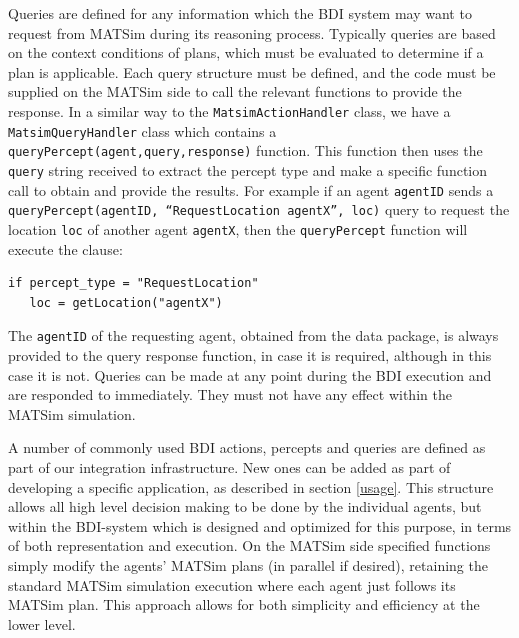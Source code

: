 Queries are defined for any information which the BDI system may want
to request from MATSim during its reasoning process. Typically queries
are based on the context conditions of plans, which must be evaluated
to determine if a plan is applicable. Each query structure must be
defined, and the code must be supplied on the MATSim side to call the
relevant functions to provide the response. 
In a similar way to the \texttt{MatsimActionHandler} class, we have a
\texttt{MatsimQueryHandler} 
class which contains a \texttt{queryPercept(agent,query,response)}
function.
This function then uses the \texttt{query} string received to extract the
percept type and make a specific function call to obtain and provide the
results. For example if an agent \texttt{agentID} sends a
\texttt{queryPercept(agentID, ``RequestLocation agentX'', loc)} query to
request the location \texttt{loc} of another agent \texttt{agentX}, then the
\texttt{queryPercept} 
function will execute the clause:
\begin{verbatim}
if percept_type = "RequestLocation"
   loc = getLocation("agentX")
\end{verbatim}
The \texttt{agentID} of
the requesting agent, obtained from the data package, is always
provided to the query response function, in case it is required, 
although in this case it is not.
Queries can be made at any point
during the BDI execution and are responded to immediately. They must
not have any effect within the MATSim simulation.

A number of commonly used BDI actions, percepts and queries are
defined as part of our integration infrastructure. New ones can be
added as part of developing a specific application, as described in
section \ref{usage}.
%
This structure allows all high level decision making to be done by the
individual agents, but within the BDI-system which is designed and
optimized for this purpose, in terms of both representation and
execution. On the MATSim side specified functions simply modify the
agents' MATSim plans (in parallel if desired), retaining the standard
MATSim simulation execution where each agent just follows its MATSim
plan.  This approach allows for both simplicity and efficiency at the
lower level.

